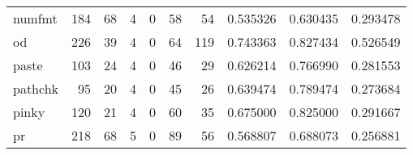 \begin{tabular}{lrrrrrrrrr}
numfmt    &                                                184 &                                                 68 &                                                  4 &                                                  0 &                                                 58 &                                                 54 &                                           0.535326 &                               0.630435 &                             0.293478 \\
od        &                                                226 &                                                 39 &                                                  4 &                                                  0 &                                                 64 &                                                119 &                                           0.743363 &                               0.827434 &                             0.526549 \\
paste     &                                                103 &                                                 24 &                                                  4 &                                                  0 &                                                 46 &                                                 29 &                                           0.626214 &                               0.766990 &                             0.281553 \\
pathchk   &                                                 95 &                                                 20 &                                                  4 &                                                  0 &                                                 45 &                                                 26 &                                           0.639474 &                               0.789474 &                             0.273684 \\
pinky     &                                                120 &                                                 21 &                                                  4 &                                                  0 &                                                 60 &                                                 35 &                                           0.675000 &                               0.825000 &                             0.291667 \\
pr        &                                                218 &                                                 68 &                                                  5 &                                                  0 &                                                 89 &                                                 56 &                                           0.568807 &                               0.688073 &                             0.256881 \\

\end{tabular}
